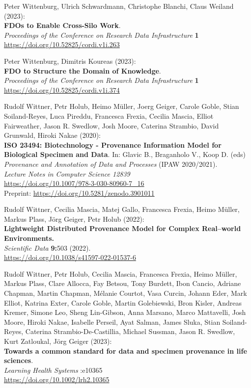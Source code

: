 \begin{thebibliography}{9}
Peter Wittenburg, Ulrich Schwardmann, Christophe Blanchi, Claus Weiland (2023):\\
\textbf{FDOs to Enable Cross-Silo Work}.\\
\emph{Proceedings of the Conference on Research Data Infrastructure}
\textbf{1} \\
\url{https://doi.org/10.52825/cordi.v1i.263}

Peter Wittenburg, Dimitris Koureas (2023):\\
\textbf{FDO to Structure the Domain of Knowledge}.\\
\emph{Proceedings of the Conference on Research Data Infrastructure}
\textbf{1} \\
\url{https://doi.org/10.52825/cordi.v1i.374}

Rudolf Wittner, Petr Holub, Heimo Müller, Joerg Geiger, Carole Goble, Stian Soiland-Reyes, Luca Pireddu, Francesca Frexia, Cecilia Mascia, Elliot Fairweather, Jason R. Swedlow, Josh Moore, Caterina Strambio, David Grunwald, Hiroki Nakae (2020):\\
\textbf{ISO 23494: Biotechnology - Provenance Information Model for Biological Specimen and Data}.
In: Glavic B., Braganholo V., Koop D. (eds) 
\emph{Provenance and Annotation of Data and Processes} (IPAW 2020/2021).\\
\emph{Lecture Notes in Computer Science 12839}\\
\url{https://doi.org/10.1007/978-3-030-80960-7_16} \\
Preprint: \url{https://doi.org/10.5281/zenodo.3901011} 

Rudolf Wittner, Cecilia Mascia, Matej Gallo, Francesca Frexia, Heimo Müller, Markus Plass, Jörg Geiger, Petr Holub (2022):\\
\textbf{Lightweight Distributed Provenance Model for Complex Real--world
Environments.\\
}\emph{Scientific Data} \textbf{9:}503 (2022).\\
\url{https://doi.org/10.1038/s41597-022-01537-6}

Rudolf Wittner, Petr Holub, Cecilia Mascia, Francesca Frexia, Heimo Müller, Markus Plass, Clare Allocca, Fay Betsou, Tony Burdett, Ibon Cancio, Adriane Chapman, Martin Chapman, Mélanie Courtot, Vasa Curcin, Johann Eder, Mark Elliot, Katrina Exter, Carole Goble, Martin Golebiewski, Bron Kisler, Andreas Kremer, Simone Leo, Sheng Lin-Gibson, Anna Marsano, Marco Mattavelli, Josh Moore, Hiroki Nakae, Isabelle Perseil, Ayat Salman, James Sluka, Stian Soiland-Reyes, Caterina Strambio-De-Castillia, Michael Sussman, Jason R. Swedlow, Kurt Zatloukal, Jörg Geiger (2023): \\
\textbf{Towards a common standard for data and specimen provenance in life sciences}.\\
\emph{Learning Health Systems} :e10365 \\
\url{https://doi.org/10.1002/lrh2.10365}


\end{thebibliography}
